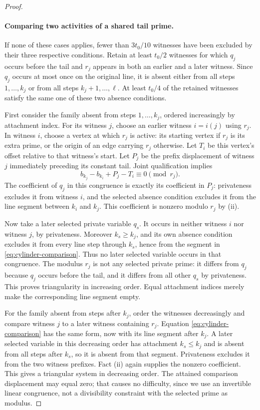 \begin{proof}
\paragraph{Comparing two activities of a shared tail prime.}
If none of these cases applies, fewer than $3t_0/10$ witnesses have
been excluded by their three respective conditions.  Retain at least
$t_0/2$ witnesses for which $q_j$ occurs before the tail and $r_j$
appears in both an earlier and a later witness.  Since $q_j$ occurs
at most once on the original line, it is absent either from all steps
$1,\ldots,k_j$ or from all steps $k_j+1,\ldots,\ell$.  At least
$t_0/4$ of the retained witnesses satisfy the same one of these two
absence conditions.

First consider the family absent from steps $1,\ldots,k_j$, ordered
increasingly by attachment index.  For its witness $j$, choose an
earlier witness $i=i(j)$ using $r_j$.  In witness $i$, choose a vertex
at which $r_j$ is active: its starting vertex if $r_j$ is its extra
prime, or the origin of an edge carrying $r_j$ otherwise.  Let $T_i$
be this vertex's offset relative to that witness's start.  Let $P_j$
be the prefix displacement of witness $j$ immediately preceding its
constant tail.  Joint qualification implies
\begin{equation}\label{eq:cylinder-comparison}
 b_{k_j}-b_{k_i}+P_j-T_i\equiv0\pmod{r_j}.
\end{equation}
The coefficient of $q_j$ in this congruence is exactly its coefficient
in $P_j$: privateness excludes it from witness $i$, and the selected
absence condition excludes it from the line segment between
$k_i$ and $k_j$.  This coefficient is nonzero modulo $r_j$ by (ii).

Now take a later selected private variable $q_s$.  It occurs in
neither witness $i$ nor witness $j$, by privateness.  Moreover
$k_s\ge k_j$, and its own absence condition excludes it from every
line step through $k_s$, hence from the segment in
\eqref{eq:cylinder-comparison}.  Thus no later selected variable occurs
in that congruence.  The modulus $r_j$ is not any selected private
prime: it differs from $q_j$ because $q_j$ occurs before the tail,
and it differs from all other $q_s$ by privateness.  This proves
triangularity in increasing order.  Equal attachment indices merely
make the corresponding line segment empty.

For the family absent from steps after $k_j$, order the witnesses
decreasingly and compare witness $j$ to a later witness containing
$r_j$.  Equation \eqref{eq:cylinder-comparison} has the same form, now
with its line segment after $k_j$.  A later selected variable in this
decreasing order has attachment $k_s\le k_j$ and is absent from all
steps after $k_s$, so it is absent from that segment.  Privateness
excludes it from the two witness prefixes.  Fact (ii) again supplies
the nonzero coefficient.  This gives a triangular system in decreasing
order.  The attained comparison displacement may equal zero; that
causes no difficulty, since we use an invertible linear congruence,
not a divisibility constraint with the selected prime as modulus.


\end{proof}
